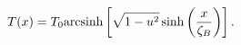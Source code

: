 \begin{equation}\label{2gr}
T(x)=T_0 {\rm arcsinh}\left[ \sqrt{1-u^2} \sinh\left( 
         \frac{x}{\zeta_B}\right) \right].
\end{equation}

